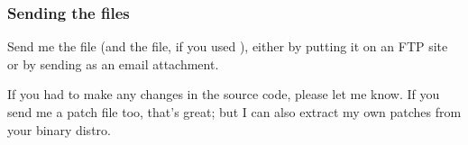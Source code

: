 \subsubsection{Sending the files}

Send me the  file (and the  file, if you used
), either by putting it on an FTP site or by sending as
an email attachment.

If you had to make any changes in the source code, please let me
know. If you send me a patch file too, that's great; but I can also
extract my own patches from your binary distro.









